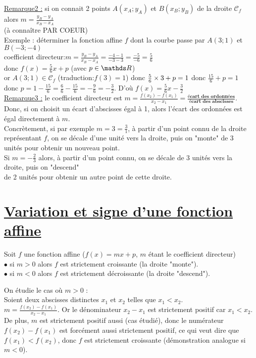 \documentclass[12 pt,a4paper]{article}
\begin{document}
\underline{Remarque2 :} si on connait 2 points $A(x_A;y_A)$  et $B(x_B;y_B)$ de la droite $\mathscr{C}_f$ alors $\boxed{m=\frac{y_B-y_A}{x_B-x_A}}$\medskip\\
(à connaître PAR COEUR)\medskip\\
Exemple : déterminer la fonction affine $f$ dont la courbe passe par $A(3;1)$ et $B(-3;-4)$\medskip\\
coefficient directeur:$m=\frac{y_B-y_A}{x_B-x_A}=\frac{-4-1}{-3-3}=\frac{-5}{-6}=\frac{5}{6}$\medskip\\
donc $f(x)=\frac{5}{6}x+p$ (avec $p\in\R$)\medskip\\
or $A(3;1)\in \mathscr{C}_f$ (traduction:$f(3)=1$) donc $\frac{5}{6}\times3+p=1$ donc $\frac{15}{6}+p=1$\medskip\\
donc $p=1-\frac{15}{6}=\frac{6}{6}-\frac{15}{6}=-\frac{9}{6}=-\frac{3}{2}$. D'où $f(x)=\frac{5}{6}x-\frac{3}{2}$\medskip\\
\underline{Remarque3 :} le coefficient directeur est  $\boxed{m=\frac{f(x_2)-f(x_1)}{x_2-x_1}=\frac{\textbf{écart des ordonnées}}{\textbf{écart des abscisses}}}$.\medskip\\
Donc, si on choisit un écart d'abscisses égal à 1, alors l'écart des ordonnées est égal directement à $m$.\medskip\\
Concrètement, si par exemple $m=3=\frac{3}{1}$, à partir d'un point connu de la droite représentant $f$, on se décale d'une unité vers la droite, puis on "monte" de 3 unités pour obtenir un nouveau point.\medskip\\
Si $m=-\frac{2}{3}$ alors, à partir d'un point connu, on se décale de 3 unités vers la droite, puis on "descend"\medskip\\
de 2 unités pour obtenir un autre point de cette droite.

\bigskip
\section{\underline{Variation et signe d'une fonction affine}}
\begin{prop} Soit $f$ une fonction affine ($f(x)=mx+p$, $m$ étant le coefficient directeur)\medskip\\
$\bullet$ si $m>0$ alors $f$ est strictement croissante (la droite "monte").\medskip\\
$\bullet$ si $m<0$ alors $f$ est strictement décroissante (la droite "descend").\medskip
\end{prop}
\begin{pf} On étudie le cas où $m>0$ : \medskip\\
Soient deux abscisses distinctes $x_1$ et $x_2$ telles que $x_1<x_2$.\medskip\\
$m=\frac{f(x_2)-f(x_1)}{x_2-x_1}$. Or le dénominateur $x_2-x_1$ est strictement positif car $x_1<x_2$.\medskip\\
De plus, $m$ est strictement positif aussi (cas étudié), donc le numérateur $f(x_2)-f(x_1)$ est forcément aussi strictement positif, ce qui veut dire que $f(x_1)<f(x_2)$, donc $f$ est strictement croissante (démonstration analogue si $m<0$).
\end{pf}
\end{document}
